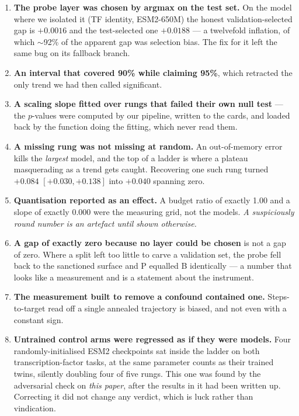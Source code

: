 \documentclass[11pt]{article}
\begin{document}
\begin{enumerate}
\itemsep3pt
\item \textbf{The probe layer was chosen by argmax on the test set.} On the model
where we isolated it (TF identity, ESM2-650M) the honest validation-selected gap
is $+0.0016$ and the test-selected one $+0.0188$ --- a twelvefold inflation, of
which $\sim$92\% of the apparent gap was selection bias. The fix for it left the
same bug on its fallback branch.
\item \textbf{An interval that covered 90\% while claiming 95\%}, which retracted
the only trend we had then called significant.
\item \textbf{A scaling slope fitted over rungs that failed their own null test}
--- the $p$-values were computed by our pipeline, written to the cards, and loaded
back by the function doing the fitting, which never read them.
\item \textbf{A missing rung was not missing at random.} An out-of-memory error
kills the \emph{largest} model, and the top of a ladder is where a plateau
masquerading as a trend gets caught. Recovering one such rung turned $+0.084$
$[+0.030, +0.138]$ into $+0.040$ spanning zero.
\item \textbf{Quantisation reported as an effect.} A budget ratio of exactly 1.00
and a slope of exactly 0.000 were the measuring grid, not the models. \emph{A
suspiciously round number is an artefact until shown otherwise.}
\item \textbf{A gap of exactly zero because no layer could be chosen} is not a gap
of zero. Where a split left too little to carve a validation set, the probe fell
back to the sanctioned surface and P equalled B identically --- a number that
looks like a measurement and is a statement about the instrument.
\item \textbf{The measurement built to remove a confound contained one.}
Steps-to-target read off a single annealed trajectory is biased, and not even with
a constant sign.
\item \textbf{Untrained control arms were regressed as if they were models.} Four
randomly-initialised ESM2 checkpoints sat inside the ladder on both
transcription-factor tasks, at the same parameter counts as their trained twins,
silently doubling four of five rungs. This one was found by the adversarial check
on \emph{this paper}, after the results in it had been written up. Correcting it
did not change any verdict, which is luck rather than vindication.
\end{enumerate}
\end{document}

